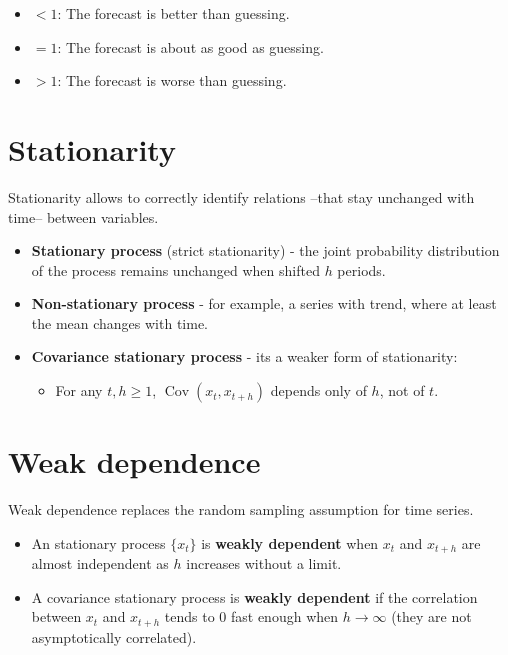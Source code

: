 \documentclass[10pt, a4paper, landscape]{article}
\DeclareMathOperator{\E}{E}
\DeclareMathOperator{\Var}{Var}
\DeclareMathOperator{\Cov}{Cov}
\begin{document}
\begin{multicols}{3}
\begin{itemize}[leftmargin=*]
	\item \( < 1 \): The forecast is better than guessing.
	\item \( = 1 \): The forecast is about as good as guessing.
	\item \( > 1 \): The forecast is worse than guessing.
\end{itemize}

\columnbreak

\section*{Stationarity}

Stationarity allows to correctly identify relations --that stay unchanged with time-- between variables.

\begin{itemize}[leftmargin=*]
	\item \textbf{Stationary process} (strict stationarity) - the joint probability distribution of the process remains unchanged when shifted \( h \) periods.
	\item \textbf{Non-stationary process} - for example, a series with trend, where at least the mean changes with time.
	\item \textbf{Covariance stationary process} - its a weaker form of stationarity:
	\begin{itemize}[leftmargin=*]
		\item For any \( t, h \geq 1 \), \( \Cov(x_{t}, x_{t + h}) \) depends only of \( h \), not of \( t \).
	\end{itemize}
\end{itemize}

\section*{Weak dependence}

Weak dependence replaces the random sampling assumption for time series.

\begin{itemize}[leftmargin=*]
	\item An stationary process \( \{ x_{t} \} \) is \textbf{weakly dependent} when \( x_{t} \) and \( x_{t + h} \) are almost independent as \( h \) increases without a limit.
	\item A covariance stationary process is \textbf{weakly dependent} if the correlation between \( x_{t} \) and \( x_{t + h} \) tends to 0 fast enough when \( h \rightarrow \infty \) (they are not asymptotically correlated).
\end{itemize}


\end{multicols}
\end{document}
